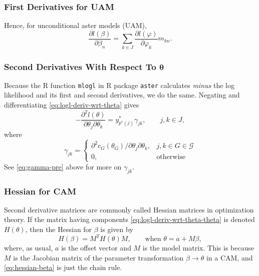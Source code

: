 \subsubsection{First Derivatives for UAM}
\label{sec:logl-uam-deriv}

Hence, for unconditional aster models (UAM),
$$
   \frac{\partial l(\beta)}{\partial \beta_n}
   =
   \sum_{k \in J}
   \frac{\partial l(\varphi)}{\partial \varphi_k}
   m_{k n}.
$$

\subsubsection{Second Derivatives With Respect To $\boldsymbol{\theta}$}
\label{sec:wrt-theta-theta}

Because the R function \texttt{mlogl} in R package \texttt{aster} calculates
\emph{minus} the log likelihood and its first and second derivatives, we do
the same.
Negating and differentiating \eqref{eq:logl-deriv-wrt-theta} gives
\begin{equation} \label{eq:logl-deriv-wrt-theta-theta}
   - \frac{\partial^2 l(\theta)}{\partial \theta_j \partial \theta_k}
   =
   y^*_{p^*(j)} \gamma_{j k},
   \qquad j, k \in J,
\end{equation}
where
\begin{equation} \label{eq:gamma}
   \gamma_{j k} = \begin{cases}
   \partial^2 c_G(\theta_G) / \partial \theta_j \partial \theta_k,
   & j, k \in G \in \mathcal{G}
   \\
   0, & \text{otherwise} \end{cases}
\end{equation}
See \eqref{eq:gamma-pre} above for more on $\gamma_{j k}$.

\subsubsection{Hessian for CAM}
\label{sec:mlogl-hessian-cam}

Second derivative matrices are commonly called Hessian matrices in optimization
theory.  If the matrix having components \eqref{eq:logl-deriv-wrt-theta-theta}
is denoted $H(\theta)$, then the Hessian for $\beta$ is given by
\begin{equation} \label{eq:hessian-beta}
   H(\beta) = M^T H(\theta) M, \qquad \text{when $\theta = a + M \beta$},
\end{equation}
where, as usual, $a$ is the offset vector and $M$ is the model matrix.
This is because $M$ is the Jacobian matrix of the parameter transformation
$\beta \to \theta$ in a CAM, and \eqref{eq:hessian-beta} is just the chain
rule.

